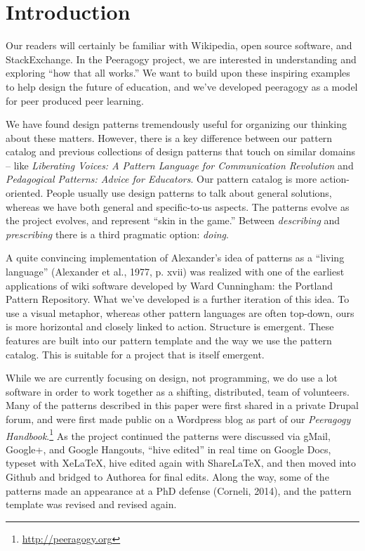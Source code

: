 \section{Introduction}

Our readers will certainly be familiar with Wikipedia, open source software, and StackExchange.  In the Peeragogy project, we are interested in understanding and exploring ``how that all works.''    We want to build upon these inspiring examples to help design the future of education, and we've developed peeragogy as a model for peer produced peer learning.

We have found design patterns tremendously useful for organizing our thinking about these matters.  However, there is a key difference between our pattern catalog and previous collections of design patterns that touch on similar domains -- like \emph{Liberating Voices: A Pattern Language for Communication Revolution} and \emph{Pedagogical Patterns: Advice for Educators}.  Our pattern catalog is more action-oriented.  People usually use design patterns to talk about general solutions, whereas we have both general and specific-to-us aspects. The patterns evolve as the project evolves, and represent ``skin in the game.''   Between \emph{describing} and \emph{prescribing} there is a third pragmatic option: \emph{doing}.  

A quite convincing implementation of Alexander’s idea of patterns as a ``living language'' (Alexander et al., 1977, p. xvii) was realized with one of the earliest applications of wiki software developed by Ward Cunningham: the Portland Pattern Repository. What we've developed is a further iteration of this idea. To use a visual metaphor, whereas other pattern languages are often top-down, ours is more horizontal and closely linked to action.  Structure is emergent.  These features are built into our pattern template and the way we use the pattern catalog.  This is suitable for a project that is itself emergent.

While we are currently focusing on design, not programming, we do use a lot software in order to work together as a shifting, distributed, team of volunteers.  Many of the patterns described in this paper were first shared in a private Drupal forum, and were first made public on a Wordpress blog as part of our \emph{Peeragogy Handbook}.\footnote{\url{http://peeragogy.org}}  As the project continued the patterns were discussed via gMail, Google+, and Google Hangouts, ``hive edited'' in real time on Google Docs, typeset with XeLaTeX, hive edited again with ShareLaTeX, and then moved into Github and bridged to Authorea for final edits.  Along the way, some of the patterns made an appearance at a PhD defense (Corneli, 2014), and the pattern template was revised and revised again.  

